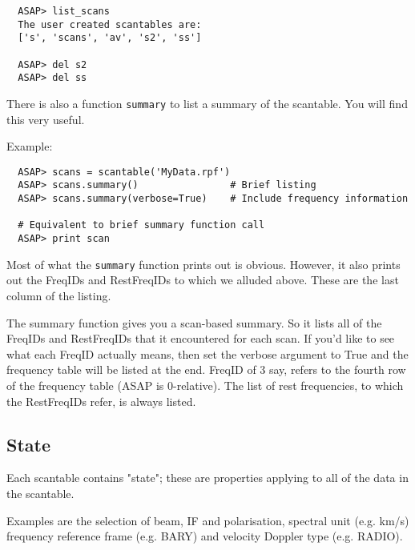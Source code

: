 \documentclass[11pt]{article}
\newcommand{\cmd}[1]{{\tt #1}}
\begin{document}
\begin{verbatim}
  ASAP> list_scans
  The user created scantables are:
  ['s', 'scans', 'av', 's2', 'ss']

  ASAP> del s2   
  ASAP> del ss
\end{verbatim}

There is also a function \cmd{summary} to list a summary of the scantable.
You will find this very useful.

Example:

\begin{verbatim}
  ASAP> scans = scantable('MyData.rpf')
  ASAP> scans.summary()                # Brief listing
  ASAP> scans.summary(verbose=True)    # Include frequency information

  # Equivalent to brief summary function call
  ASAP> print scan                     
\end{verbatim}

Most of what the \cmd{summary} function  prints out is obvious. However,
it also prints out the FreqIDs and RestFreqIDs to which we alluded above. 
These are the last column of the listing.

The summary function gives you a scan-based summary.  So it lists all of
the FreqIDs and RestFreqIDs that it encountered for each scan.  If you'd
like to see what each FreqID actually means, then set the verbose
argument to True and the frequency table will be listed at the end. 
FreqID of 3 say, refers to the fourth row of the frequency table (ASAP
is 0-relative). The list of rest frequencies, to which the RestFreqIDs
refer, is always listed.




\subsection{State}

Each scantable contains "state"; these are properties  applying to all
of the data in the scantable.  

Examples are the selection of beam, IF and polarisation,  spectral unit
(e.g. km/s) frequency reference frame (e.g. BARY) and velocity Doppler
type (e.g. RADIO).
\end{document}
